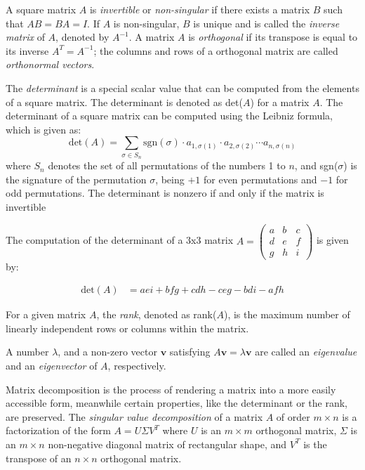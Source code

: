 A square matrix $A$ is \emph{invertible} or \emph{non-singular} if there exists a matrix $B$ such that $AB = BA = I$. If $A$ is non-singular, $B$ is unique and is called the \emph{inverse matrix} of $A$, denoted by $A^{-1}$. A matrix $A$ is \emph{orthogonal} if its transpose is equal to its inverse $A^T = A^{-1}$; the columns and rows of a orthogonal matrix are called \emph{orthonormal vectors}.

The \emph{determinant} is a special scalar value that can be computed from the elements of a square matrix. The determinant is denoted as det($A$) for a matrix $A$. The determinant of a square matrix can be computed using the Leibniz formula, which is given as:
\[
\text{det}(A) = \sum_{\sigma \in S_n} \text{sgn}(\sigma) \cdot a_{1,\sigma(1)} \cdot a_{2,\sigma(2)} \cdots a_{n,\sigma(n)}
\]
where $S_n$ denotes the set of all permutations of the numbers 1 to $n$, and sgn($\sigma$) is the signature of the permutation $\sigma$, being $+1$ for even permutations and $-1$ for odd permutations. The determinant is nonzero if and only if the matrix is invertible

\begin{example}
The computation of the determinant of a 3x3 matrix $A = \left( \begin{smallmatrix} a & b & c \\ d & e & f \\ g & h & i \end{smallmatrix} \right)$ is given by:

\begin{align*}
\text{det}(A) &= aei + bfg + cdh - ceg - bdi - afh
\end{align*}
\end{example}

For a given matrix $A$, the \emph{rank}, denoted as rank($A$), is the maximum number of linearly independent rows or columns within the matrix.

A number $\lambda$, and a non-zero vector $\mathbf{v}$ satisfying $A \mathbf{v} = \lambda \mathbf{v}$ are called an \emph{eigenvalue} and an \emph{eigenvector} of $A$, respectively.

Matrix decomposition is the process of rendering a matrix into a more easily accessible form, meanwhile certain properties, like the determinant or the rank, are preserved. The \emph{singular value decomposition} of a matrix $A$ of order $m \times n$ is a factorization of the form $A = U \Sigma V^T$ where $U$ is an $m \times m$ orthogonal matrix, $\Sigma$ is an $m \times n$ non-negative diagonal matrix of rectangular shape, and $V^T$ is the transpose of an $n \times n$ orthogonal matrix.

